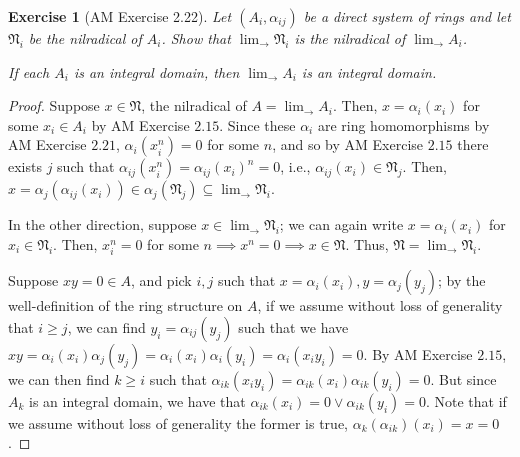 \documentclass[12pt,letterpaper]{article}
\newtheorem{problem}{Exercise}[section]
\theoremstyle{definition}
\theoremstyle{remark}
\numberwithin{figure}{problem}
\numberwithin{equation}{section}
\begin{document}
\begin{problem}[AM Exercise 2.22]
  Let $(A_i,\alpha_{ij})$ be a direct system of rings and let $\mathfrak{N}_i$ be the nilradical of $A_i$. Show that $\displaystyle\lim_{\longrightarrow} \mathfrak{N}_i$ is the nilradical of $\displaystyle\lim_{\longrightarrow} A_i$.
  \par If each $A_i$ is an integral domain, then $\displaystyle\lim_{\longrightarrow} A_i$ is an integral domain.
\end{problem}
\begin{proof}
  Suppose $x \in \mathfrak{N}$, the nilradical of $A = \displaystyle\lim_{\longrightarrow} A_i$. Then, $x = \alpha_i(x_i)$ for some $x_i \in A_i$ by AM Exercise $2.15$. Since these $\alpha_i$ are ring homomorphisms by AM Exercise $2.21$, $\alpha_i(x_i^n) = 0$ for some $n$, and so by AM Exercise $2.15$ there exists $j$ such that $\alpha_{ij}(x_i^n) = \alpha_{ij}(x_i)^n = 0$, i.e., $\alpha_{ij}(x_i) \in \mathfrak{N}_j$. Then, $x = \alpha_j(\alpha_{ij}(x_i)) \in \alpha_j(\mathfrak{N}_j) \subseteq \displaystyle\lim_{\longrightarrow} \mathfrak{N}_i$.
  \par In the other direction, suppose $x \in \displaystyle\lim_{\longrightarrow} \mathfrak{N}_i$; we can again write $x = \alpha_i(x_i)$ for $x_i \in \mathfrak{N}_i$. Then, $x_i^n = 0$ for some $n \implies x^n = 0 \implies x \in \mathfrak{N}$. Thus, $\mathfrak{N} = \displaystyle\lim_{\longrightarrow} \mathfrak{N}_i$.
  \par Suppose $xy = 0 \in A$, and pick $i,j$ such that $x = \alpha_i(x_i), y = \alpha_j(y_j)$; by the well-definition of the ring structure on $A$, if we assume without loss of generality that $i \geqslant j$, we can find $y_i = \alpha_{ij}(y_j)$ such that we have $xy = \alpha_i(x_i)\alpha_j(y_j) = \alpha_i(x_i)\alpha_i(y_i) = \alpha_i(x_iy_i) = 0$. By AM Exercise $2.15$, we can then find $k \geqslant i$ such that $\alpha_{ik}(x_iy_i) = \alpha_{ik}(x_i)\alpha_{ik}(y_i) = 0$. But since $A_k$ is an integral domain, we have that $\alpha_{ik}(x_i) = 0 \lor \alpha_{ik}(y_i) = 0$. Note that if we assume without loss of generality the former is true, $\alpha_k(\alpha_{ik})(x_i) = x = 0$.
\end{proof}

\printbibliography
\end{document}
